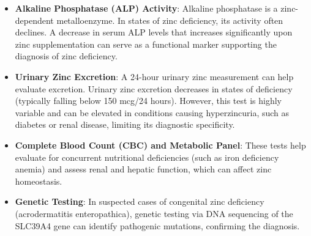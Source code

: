 \begin{itemize}
\begin{itemize}
        \item Hypoalbuminemia can also falsely lower serum zinc, as approximately 60\% of circulating zinc is bound to albumin.
    \end{itemize}
    \item \textbf{Alkaline Phosphatase (ALP) Activity}: Alkaline phosphatase is a zinc-dependent metalloenzyme. In states of zinc deficiency, its activity often declines. A decrease in serum ALP levels that increases significantly upon zinc supplementation can serve as a functional marker supporting the diagnosis of zinc deficiency.
    \item \textbf{Urinary Zinc Excretion}: A 24-hour urinary zinc measurement can help evaluate excretion. Urinary zinc excretion decreases in states of deficiency (typically falling below 150 mcg/24 hours). However, this test is highly variable and can be elevated in conditions causing hyperzincuria, such as diabetes or renal disease, limiting its diagnostic specificity.
    \item \textbf{Complete Blood Count (CBC) and Metabolic Panel}: These tests help evaluate for concurrent nutritional deficiencies (such as iron deficiency anemia) and assess renal and hepatic function, which can affect zinc homeostasis.
    \item \textbf{Genetic Testing}: In suspected cases of congenital zinc deficiency (acrodermatitis enteropathica), genetic testing via DNA sequencing of the SLC39A4 gene can identify pathogenic mutations, confirming the diagnosis.
\end{itemize}

